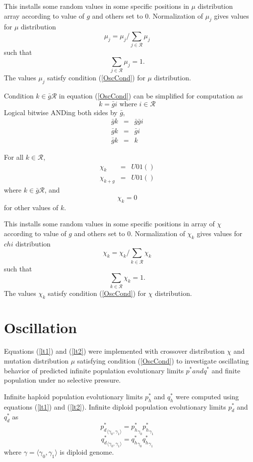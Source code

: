 This installs some random values in some specific positions in $\mu$ distribution array according to value of $g$ and others set to $0$. 
Normalization of $\mu_j$ gives values for $\mu$ distribution
\[
\mu_j = \mu_j / \sum \limits_{j \in \mathcal{R} } \mu_j
\]
such that 
\[
\sum \limits_{j \in \mathcal{R} } \mu_j = 1.
\]
The values $\mu_j$ satisfy condition (\ref{OscCond}) for $\mu$ distribution.


Condition $k \in \bar{g} \mathcal{R}$ in equation (\ref{OscCond}) can be simplified for computation as
\[
k = \bar{g} i  \text{ where $i \in \mathcal{R}$}
\]
Logical bitwise ANDing both sides by $\bar{g}$,
\begin{eqnarray*}
\bar{g} k & = & \bar{g} \bar{g} i \\
\bar{g} k & = & \bar{g} i \\
\bar{g} k & = & k 
\end{eqnarray*}

For all $k \in \mathcal{R}$,
\begin{eqnarray*}
\chi_k & = & U01() \\
\chi_{k+g} & = & U01() 
\end{eqnarray*}
where $k \in \bar{g} \mathcal{R}$, and
\[
\chi_k = 0
\]
for other values of $k$. \newline

This installs some random values in some specific positions in array of $\chi$ according to value of $g$ and others set to $0$. Normalization of $\chi_k$ gives values for $chi$ distribution 
\[
\chi_k = \chi_k/\sum\limits_{k \in \mathcal{R}} \chi_k
\]
such that 
\[
\sum\limits_{k \in \mathcal{R}} \chi_k = 1.
\]
The values $\chi_k$ satisfy condition (\ref{OscCond}) for $\chi$ distribution.

\section{Oscillation}
\label{Oscillation}

Equations (\ref{lt1}) and (\ref{lt2}) were implemented with crossover distribution $\chi$ and mutation distribution $\mu$ satisfying condition (\ref{OscCond}) to investigate oscillating behavior of predicted infinite population evolutionary limits $p^{\ast} and q^{\ast}$ and finite population under no selective pressure.

Infinite haploid population evolutionary limits $p_h^{\ast}$ and $q_h^{\ast}$ were computed using equations (\ref{lt1}) and (\ref{lt2}). Infinite diploid population evolutionary limits $p_d^{\ast}$ and $q_d^{\ast}$ as
\[
{p_d^{\ast}}_{\langle \gamma_0, \gamma_1 \rangle} = {p_h^{\ast}}_{\gamma_0} {p_h^{\ast}}_{\gamma_1}
\]
\[
{q_d^{\ast}}_{\langle \gamma_0, \gamma_1 \rangle} = {q_h^{\ast}}_{\gamma_0} {q_h^{\ast}}_{\gamma_1}
\]
where $\gamma = \langle \gamma_0, \gamma_1 \rangle$ is diploid genome.


